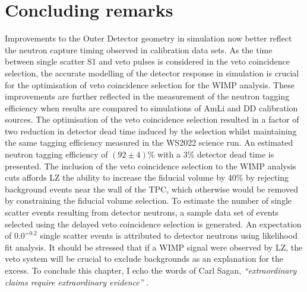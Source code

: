 \section{Concluding remarks}
Improvements to the Outer Detector geometry in simulation now better reflect the neutron capture timing observed in calibration data sets. As the time between single scatter S1 and veto pulses is considered in the veto coincidence selection, the accurate modelling of the detector response in simulation is crucial for the optimisation of veto coincidence selection for the WIMP analysis. These improvements are further reflected in the measurement of the neutron tagging efficiency when results are compared to simulations of AmLi and DD calibration sources. The optimisation of the veto coincidence selection resulted in a factor of two reduction in detector dead time induced by the selection whilst maintaining the same tagging efficiency measured in the WS2022 science run. An estimated neutron tagging efficiency of $(92\pm4)\%$ with a 3\% detector dead time is presented. The inclusion of the veto coincidence selection to the WIMP analysis cuts affords LZ the ability to increase the fiducial volume by 40\% by rejecting background events near the wall of the TPC, which otherwise would be removed by constraining the fiducial volume selection. To estimate the number of single scatter events resulting from detector neutrons, a sample data set of events selected using the delayed veto coincidence selection is generated. An expectation of $0.0^{+0.2}$ single scatter events is attributed to detector neutrons using likelihood fit analysis. It should be stressed that if a WIMP signal were observed by LZ, the veto system will be crucial to exclude backgrounds as an explanation for the excess. To conclude this chapter, I echo the words of Carl Sagan, \textit{``extraordinary claims require extraordinary evidence''} \cite{SaganCarl:BrocasBrain}.